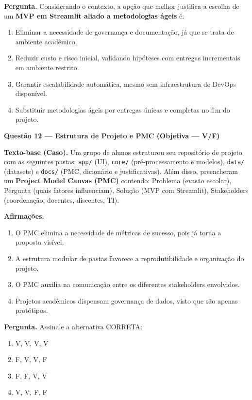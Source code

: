 \documentclass[12pt,a4paper]{article}
\begin{document}
\noindent\textbf{Pergunta.} Considerando o contexto, a opção que melhor justifica a escolha de um \textbf{MVP em Streamlit aliado a metodologias ágeis} é:
\begin{enumerate}[label=\alph*)]
\item Eliminar a necessidade de governança e documentação, já que se trata de ambiente acadêmico.  
\item Reduzir custo e risco inicial, validando hipóteses com entregas incrementais em ambiente restrito.  
\item Garantir escalabilidade automática, mesmo sem infraestrutura de DevOps disponível.  
\item Substituir metodologias ágeis por entregas únicas e completas no fim do projeto.  
\end{enumerate}

\vfill

\newpage
\noindent\textbf{Questão 12 — Estrutura de Projeto e PMC (Objetiva — V/F)}  
\par\noindent\textbf{Texto-base (Caso).}  
Um grupo de alunos estruturou seu repositório de projeto com as seguintes pastas: \texttt{app/} (UI), \texttt{core/} (pré-processamento e modelos), \texttt{data/} (datasets) e \texttt{docs/} (PMC, dicionário e justificativas). Além disso, preencheram um \textbf{Project Model Canvas (PMC)} contendo: Problema (evasão escolar), Pergunta (quais fatores influenciam), Solução (MVP com Streamlit), Stakeholders (coordenação, docentes, discentes, TI).  

\noindent\textbf{Afirmações.}
\begin{enumerate}[label=\Roman*.]
\item O PMC elimina a necessidade de métricas de sucesso, pois já torna a proposta visível.  
\item A estrutura modular de pastas favorece a reprodutibilidade e organização do projeto.  
\item O PMC auxilia na comunicação entre os diferentes stakeholders envolvidos.  
\item Projetos acadêmicos dispensam governança de dados, visto que são apenas protótipos.  
\end{enumerate}

\noindent\textbf{Pergunta.} Assinale a alternativa CORRETA:
\begin{enumerate}[label=\alph*)]
\item V, V, V, V  
\item F, V, V, F  
\item F, F, V, V  
\item V, V, F, F  
\end{enumerate}
\end{document}

